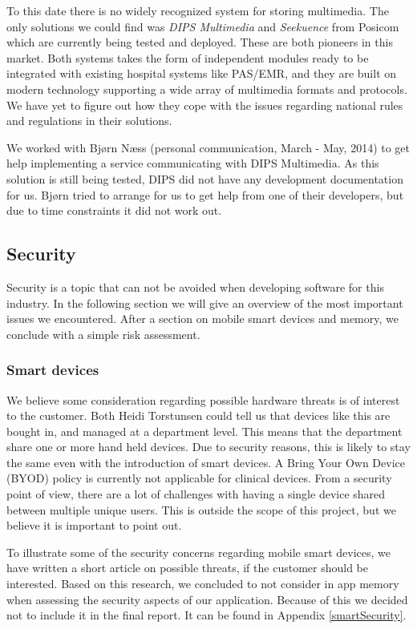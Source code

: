 To this date there is no widely recognized system for storing multimedia. The only solutions we could find was \emph{DIPS Multimedia} \cite{dipsmultimedia} and \emph{Seekuence} from Posicom \cite{posicom} which are currently being tested and deployed. These are both pioneers in this market. Both systems takes the form of independent modules ready to be integrated with existing hospital systems like PAS/EMR, and they are built on modern technology supporting a wide array of multimedia formats and protocols. We have yet to figure out how they cope with the issues regarding national rules and regulations in their solutions.

We worked with Bjørn Næss (personal communication, March - May, 2014) to get help implementing a service communicating with DIPS Multimedia. As this solution is still being tested, DIPS did not have any development documentation for us. Bjørn tried to arrange for us to get help from one of their developers, but due to time constraints it did not work out.



\subsection{Security}
Security is a topic that can not be avoided when developing software for this industry. In the following section we will give an overview of the most important issues we encountered. After a section on mobile smart devices and memory, we conclude with a simple risk assessment.

\subsubsection{Smart devices}
We believe some consideration regarding possible hardware threats is of interest to the customer. Both Heidi Torstunsen could tell us that devices like this are bought in, and managed at a department level. This means that the department share one or more hand held devices. Due to security reasons, this is likely to stay the same even with the introduction of smart devices. A Bring Your Own Device (BYOD) policy is currently not applicable for clinical devices. From a security point of view, there are a lot of challenges with having a single device shared between multiple unique users. This is outside the scope of this project, but we believe it is important to point out.

To illustrate some of the security concerns regarding mobile smart devices, we have written a short article on possible threats, if the customer should be interested. Based on this research, we concluded to not consider in app memory when assessing the security aspects of our application. Because of this we decided not to include it in the final report. It can be found in Appendix \ref{smartSecurity}.



